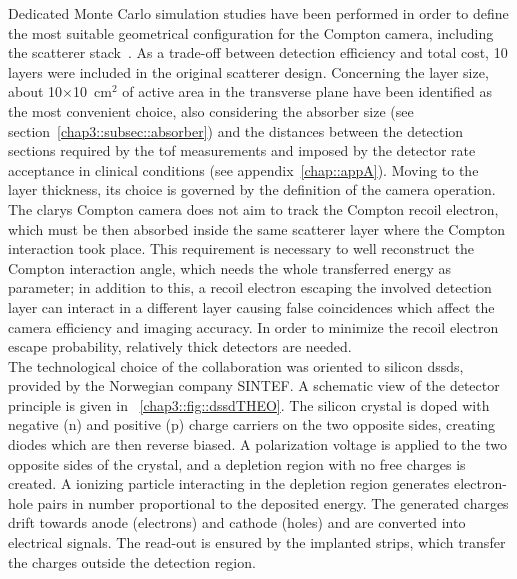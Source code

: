 Dedicated Monte Carlo simulation studies have been performed in order to define the most suitable geometrical configuration for the Compton camera, including the scatterer stack~\parencite{Richard2012}. As a trade-off between detection efficiency and total cost, 10 layers were included in the original scatterer design. Concerning the layer size, about 10$\times$10~cm$^{2}$ of active area in the transverse plane have been identified as the most convenient choice, also considering the absorber size (see section~\ref{chap3::subsec::absorber}) and the distances between the detection sections required by the \gls{tof} measurements and imposed by the detector rate acceptance in clinical conditions (see appendix~\ref{chap::appA}). Moving to the layer thickness, its choice is governed by the definition of the camera operation. The \gls{clarys} Compton camera does not aim to track the Compton recoil electron, which must be then absorbed inside the same scatterer layer where the Compton interaction took place. This requirement is necessary to well reconstruct the Compton interaction angle, which needs the whole transferred energy as parameter; in addition to this, a recoil electron escaping the involved detection layer can interact in a different layer causing false coincidences which affect the camera efficiency and imaging accuracy. In order to minimize the recoil electron escape probability, relatively thick detectors are needed.\\
The technological choice of the collaboration was oriented to silicon \glspl{dssd}, provided by the Norwegian company SINTEF. A schematic view of the detector principle is given in \figurename~\ref{chap3::fig::dssdTHEO}. The silicon crystal is doped with negative (n) and positive (p) charge carriers on the two opposite sides, creating diodes which are then reverse biased. A polarization voltage is applied to the two opposite sides of the crystal, and a depletion region with no free charges is created. A ionizing particle interacting in the depletion region generates electron-hole pairs in number proportional to the deposited energy. The generated charges drift towards anode (electrons) and cathode (holes) and are converted into electrical signals. The read-out is ensured by the implanted strips, which transfer the charges outside the detection region.\\     

